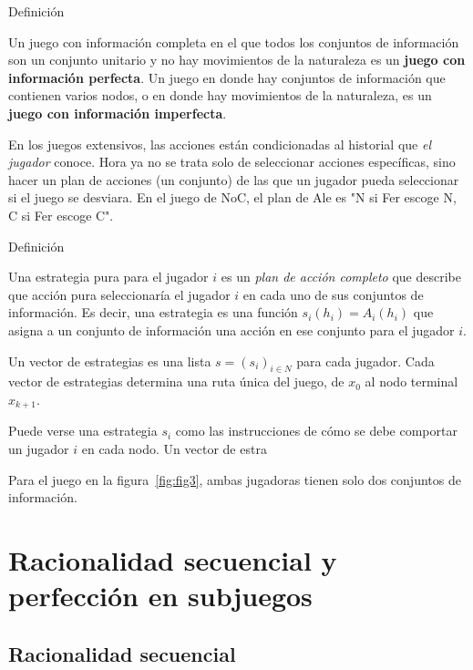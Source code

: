 \documentclass[12pt]{scrartcl}
\begin{document}
\begin{mybox}{Definición}
	\begin{defi}
		Un juego con información completa en el que todos los conjuntos de información son un conjunto unitario y no hay movimientos de la naturaleza es un \textbf{juego con información perfecta}. Un juego en donde hay conjuntos de información que contienen varios nodos, o en donde hay movimientos de la naturaleza, es un \textbf{juego con información imperfecta}.
	\end{defi}
	\label{def:def2}
\end{mybox}

En los juegos extensivos, las acciones están condicionadas al historial que \textit{el jugador} conoce. Hora ya no se trata solo de seleccionar acciones específicas, sino hacer un plan de acciones (un conjunto) de las que un jugador pueda seleccionar si el juego se desviara. En el juego de NoC, el plan de Ale es "N si Fer escoge N, C si Fer escoge C".

\begin{mybox}{Definición}
	\begin{defi}
		Una estrategia pura para el jugador $i$ es un \textit{plan de acción completo} que describe que acción pura seleccionaría el jugador $i$ en cada uno de sus conjuntos de información. Es decir, una estrategia es una función $s_i(h_i)=A_i(h_i)$ que asigna a un conjunto de información una acción en ese conjunto para el jugador $i$.
		        
		Un vector de estrategias es una lista $s=(s_i)_{i\in N}$ para cada jugador. Cada vector de estrategias determina una ruta única del juego, de $x_0$ al nodo terminal $x_{k+1}$.
	\end{defi}
	\label{def:def3}
\end{mybox}

Puede verse una estrategia $s_i$ como las instrucciones de cómo se debe comportar un jugador $i$ en cada nodo. Un vector de estra

Para el juego en la figura~\ref{fig:fig3}, ambas jugadoras tienen solo dos conjuntos de información. 

\section{Racionalidad secuencial y perfección en subjuegos}

\subsection{Racionalidad secuencial}
\end{document}
